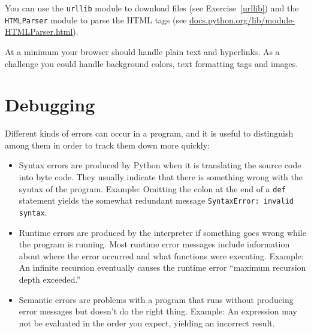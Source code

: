 \documentclass[10pt]{book}
\begin{document}
{\begin{ex}
You can use the {\tt urllib} module to download files
(see Exercise~\ref{urllib}) and
the {\tt HTMLParser} module to parse the HTML
tags (see \url{docs.python.org/lib/module-HTMLParser.html}).


At a minimum your browser should handle plain text and hyperlinks.  As
a challenge you could handle background colors, text
formatting tags and images.

\end{ex}



\appendix

\chapter{Debugging}

Different kinds of errors can occur
in a program, and it is useful to distinguish among them
in order to track them down more quickly:

\begin{itemize}

\item Syntax errors are produced by Python when it is translating the
  source code into byte code.  They usually indicate that there is
  something wrong with the syntax of the program.  Example: Omitting
  the colon at the end of a {\tt def} statement yields the somewhat
  redundant message {\tt SyntaxError: invalid syntax}.

\item Runtime errors are produced by the interpreter if something goes
  wrong while the program is running.  Most runtime error messages
  include information about where the error occurred and what
  functions were executing.  Example: An infinite recursion eventually
  causes the runtime error ``maximum recursion depth exceeded.''

\item Semantic errors are problems with a program that runs without
  producing error messages but doesn't do the right thing.  Example:
  An expression may not be evaluated in the order you expect, yielding
  an incorrect result.

\end{itemize}


}
\end{document}
